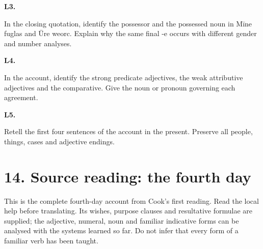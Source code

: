 \par\begin{minipage}{\linewidth}\raggedright
\textbf{L3.}

In the closing quotation, identify the possessor and the possessed noun in Mīne fuglas and Ūre weorc. Explain why the same final -e occurs with different gender and number analyses.

\end{minipage}\par\addvspace{4pt}

\par\begin{minipage}{\linewidth}\raggedright
\textbf{L4.}

In the account, identify the strong predicate adjectives, the weak attributive adjectives and the comparative. Give the noun or pronoun governing each agreement.

\end{minipage}\par\addvspace{4pt}

\par\begin{minipage}{\linewidth}\raggedright
\textbf{L5.}

Retell the first four sentences of the account in the present. Preserve all people, things, cases and adjective endings.

\end{minipage}\par\addvspace{4pt}

\section*{14. Source reading: the fourth day}

This is the complete fourth-day account from Cook’s first reading. Read the local help before translating. Its wishes, purpose clauses and resultative formulae are supplied; the adjective, numeral, noun and familiar indicative forms can be analysed with the systems learned so far. Do not infer that every form of a familiar verb has been taught.

